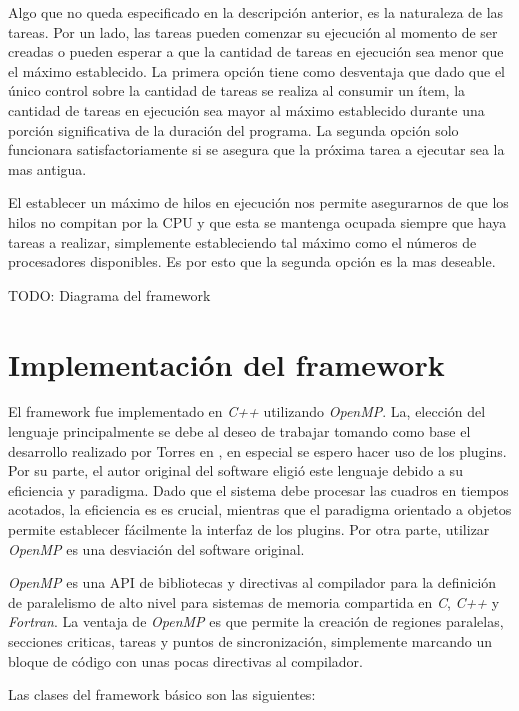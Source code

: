 Algo que no queda especificado en la descripción anterior, es la naturaleza de
las tareas. Por un lado, las tareas pueden comenzar su ejecución al momento de
ser creadas o pueden esperar a que la cantidad de tareas en ejecución sea menor
que el máximo establecido. La primera opción tiene como desventaja que dado que
el único control sobre la cantidad de tareas se realiza al consumir un ítem, la
cantidad de tareas en ejecución sea mayor al máximo establecido durante una
porción significativa de la duración del programa. La segunda opción solo
funcionara satisfactoriamente si se asegura que la próxima tarea a ejecutar sea
la mas antigua.

El establecer un máximo de hilos en ejecución nos permite asegurarnos de que los
hilos no compitan por la CPU y que esta se mantenga ocupada siempre que haya
tareas a realizar, simplemente estableciendo tal máximo como el números de
procesadores disponibles. Es por esto que la segunda opción es la mas deseable.

TODO: Diagrama del framework

\section{Implementación del framework}

El framework fue implementado en \emph{C++} utilizando \emph{OpenMP}. La,
elección del lenguaje principalmente se debe al deseo de trabajar tomando como
base el desarrollo realizado por Torres en \cite{torres2014}, en especial se
espero hacer uso de los plugins. Por su parte, el autor original del software
eligió este lenguaje debido a su eficiencia y paradigma. Dado que el sistema
debe procesar las cuadros en tiempos acotados, la eficiencia es es crucial,
mientras que el paradigma orientado a objetos permite establecer fácilmente la
interfaz de los plugins. Por otra parte, utilizar \emph{OpenMP} es una
desviación del software original.

\emph{OpenMP} es una API de bibliotecas y directivas al compilador para la
definición de paralelismo de alto nivel para sistemas de memoria compartida en
\emph{C}, \emph{C++} y \emph{Fortran}\cite{ompWeb}. La ventaja de \emph{OpenMP}
es que permite la creación de regiones paralelas, secciones criticas, tareas y
puntos de sincronización, simplemente marcando un bloque de código con unas
pocas directivas al compilador.

Las clases del framework básico son las siguientes:

